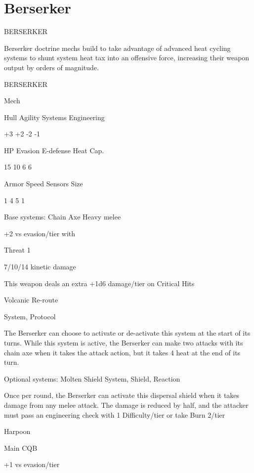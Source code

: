 \section{Berserker}
                                            BERSERKER  

Berserker doctrine mechs build to take advantage of advanced heat cycling systems to shunt  
system heat tax into an offensive force, increasing their weapon output by orders of magnitude.   

       BERSERKER 

       Mech 

       Hull      Agility      Systems       Engineering 

       +3         +2          -2            -1 

       HP         Evasion     E-defense     Heat Cap. 

       15         10          6             6 

       Armor     Speed        Sensors       Size 

       1          4           5             1 

Base systems:  
Chain Axe  
Heavy melee
 
+2 vs evasion/tier with
 
Threat 1
 
7/10/14 kinetic damage
 
This weapon deals an extra +1d6 damage/tier on Critical Hits
 

Volcanic Re-route
 
System, Protocol
 
The Berserker can choose to activate or de-activate this system at the start of its turns. While  
this system is active, the Berserker can make two attacks with its chain axe when it takes the  
attack action, but it takes 4 heat at the end of its turn.
 

Optional systems:  
Molten Shield  
System, Shield, Reaction
 
Once per round, the Berserker can activate this dispersal shield when it takes damage from any  
melee attack. The damage is reduced by half, and the attacker must pass an engineering check  
with 1 Difficulty/tier or take Burn 2/tier
 

Harpoon 
 
Main CQB
 
+1 vs evasion/tier
 

                                                                                                         


